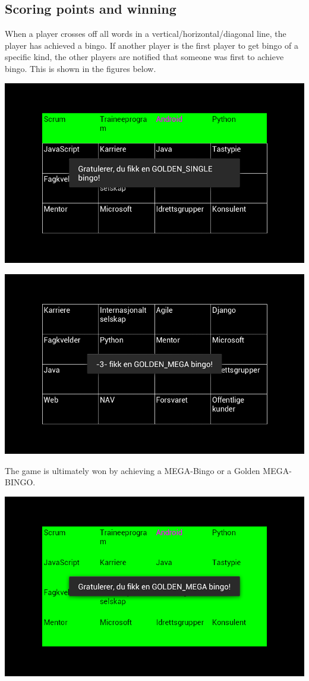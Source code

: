 \subsection{Scoring points and winning}
When a player crosses off all words in a vertical/horizontal/diagonal line, the player has achieved a bingo. If another player is the first player to get bingo of a specific kind, the other players are notified that someone was first to achieve bingo. This is shown in the figures below.

\begin{center}
\includegraphics[scale=0.5]{Pikks/GoldenSingle}
\end{center}

\begin{center}
\includegraphics[scale=0.5]{Pikks/Notificationfromserver}
\end{center}


The game is ultimately won by achieving a MEGA-Bingo or a Golden MEGA-BINGO. 

\begin{center}
\includegraphics[scale=0.5]{Pikks/GoldenMega}
\end{center}

